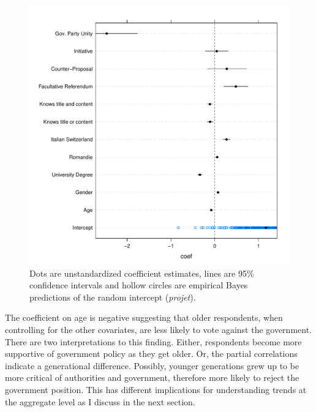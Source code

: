 \documentclass[11pt,a4paper]{article}\usepackage[]{graphicx}\usepackage[]{color}
\makeatletter
\def\maxwidth{ %
  \ifdim\Gin@nat@width>\linewidth
    \linewidth
  \else
    \Gin@nat@width
  \fi
}
\newenvironment{knitrout}{}{} %
\makeatother
\begin{document}
    \begin{figure}[htb]
\begin{knitrout}
\color{fgcolor}
\includegraphics[width=\maxwidth]{figure/fig3-1} 

\end{knitrout}
        \caption{Dots are unstandardized coefficient estimates, lines are 95\% confidence intervals and hollow circles are empirical Bayes predictions of the random intercept (\textit{projet}).}\label{fig:coef}
    \end{figure}
    
    The coefficient on age is negative suggesting that older respondents, when controlling for the other covariates, are less likely to vote against the government. There are two interpretations to this finding. Either, respondents become more supportive of government policy as they get older. Or, the partial correlations indicate a generational difference. Possibly, younger generations grew up to be more critical of authorities and government, therefore more likely to reject the government position. %
    This has different implications for understanding trends at the aggregate level as I discuss in the next section.
    
\end{document}
